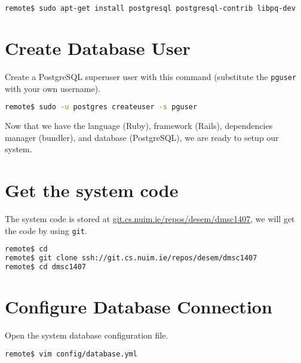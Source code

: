 \begin{minipage}{\linewidth}
\begin{lstlisting}[language=bash]
remote$ sudo apt-get install postgresql postgresql-contrib libpq-dev
\end{lstlisting}
\end{minipage}

\section{Create Database User}

Create a PostgreSQL superuser user with this command
(substitute the \texttt{pguser} with your own username).

\begin{minipage}{\linewidth}
\begin{lstlisting}[language=bash]
remote$ sudo -u postgres createuser -s pguser
\end{lstlisting}
\end{minipage}

Now that we have the language (Ruby), framework (Rails),
dependencies manager (bundler), and database (PostgreSQL),
we are ready to setup our system.

\section{Get the system code}

The system code is stored at \url{git.cs.nuim.ie/repos/desem/dmsc1407},
we will get the code by using \texttt{git}.

\begin{minipage}{\linewidth}
\begin{lstlisting}[language=bash]
remote$ cd
remote$ git clone ssh://git.cs.nuim.ie/repos/desem/dmsc1407
remote$ cd dmsc1407
\end{lstlisting}
\end{minipage}

\section{Configure Database Connection}

Open the system database configuration file.

\begin{minipage}{\linewidth}
\begin{lstlisting}[language=bash]
remote$ vim config/database.yml
\end{lstlisting}
\end{minipage}

